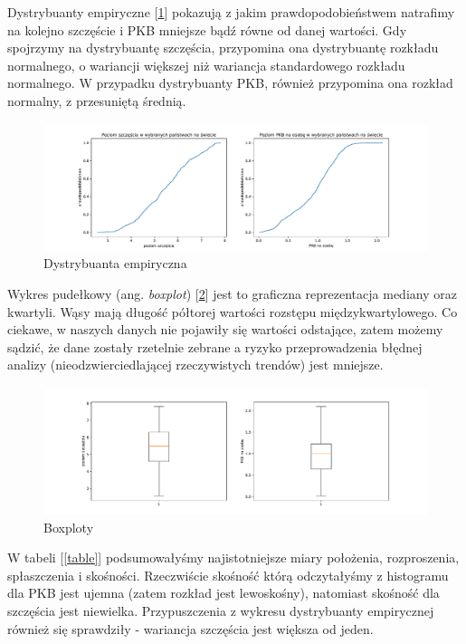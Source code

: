 \documentclass{article}
\theoremstyle{break}
\begin{document}
Dystrybuanty empiryczne [\ref{fig:distr}] pokazują z jakim prawdopodobieństwem natrafimy na kolejno szczęście i PKB mniejsze bądź równe od danej wartości. Gdy spojrzymy na dystrybuantę szczęścia, przypomina ona dystrybuantę rozkładu normalnego, o wariancji większej niż wariancja standardowego rozkładu normalnego. W przypadku dystrybuanty PKB, również przypomina ona rozkład normalny, z przesuniętą średnią. 

\begin{figure}[H]
	\begin{center}
		\includegraphics[scale=0.43]{distr.pdf}
		\caption{Dystrybuanta empiryczna}
		\label{fig:distr}
	\end{center}
\end{figure}

Wykres pudełkowy (ang. \textit{boxplot}) [\ref{fig:box}] jest to graficzna reprezentacja mediany oraz kwartyli. Wąsy mają długość półtorej wartości rozstępu międzykwartylowego. Co ciekawe, w naszych danych nie pojawiły się wartości odstające, zatem możemy sądzić, że dane zostały rzetelnie zebrane a ryzyko przeprowadzenia błędnej analizy (nieodzwierciedlającej rzeczywistych trendów) jest mniejsze.

\begin{figure}[H]
	\begin{center}
		\includegraphics[scale=0.43]{box.pdf}
		\caption{Boxploty}
		\label{fig:box}
	\end{center}
\end{figure}

W tabeli [\ref{table}] podsumowałyśmy najistotniejsze miary położenia, rozproszenia, spłaszczenia i skośności. Rzeczwiście skośność którą odczytałyśmy z histogramu dla PKB jest ujemna (zatem rozkład jest lewoskośny), natomiast skośność dla szczęścia jest niewielka. Przypuszczenia z wykresu dystrybuanty empirycznej również się sprawdziły - wariancja szczęścia jest większa od jeden. 
\end{document}
